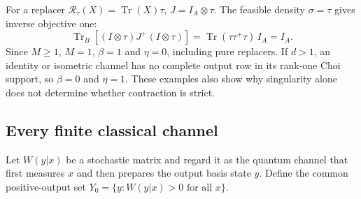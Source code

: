 \documentclass[11pt]{article}
\numberwithin{equation}{section}
\theoremstyle{definition}
\theoremstyle{remark}
\DeclareMathOperator{\Tr}{Tr}
\begin{document}
For a replacer $\mathcal R_\tau(X)=\Tr(X)\tau$, $J=I_A\otimes\tau$.
The feasible density $\sigma=\tau$ gives inverse objective one:
\[
 \Tr_B[(I\otimes\tau)J^+(I\otimes\tau)]
 =\Tr(\tau\tau^+\tau)\,I_A=I_A.
\]
Since $M\geq1$, $M=1$, $\beta=1$ and $\eta=0$, including pure
replacers. If $d>1$, an identity or isometric channel has no complete
output row in its rank-one Choi support, so $\beta=0$ and $\eta=1$.
These examples also show why singularity alone does not determine
whether contraction is strict.

\subsection{Every finite classical channel}

Let $W(y|x)$ be a stochastic matrix and regard it as the quantum channel
that first measures $x$ and then prepares the output basis state $y$.
Define the common positive-output set
$Y_0=\{y:W(y|x)>0\text{ for all }x\}$.
\end{document}
